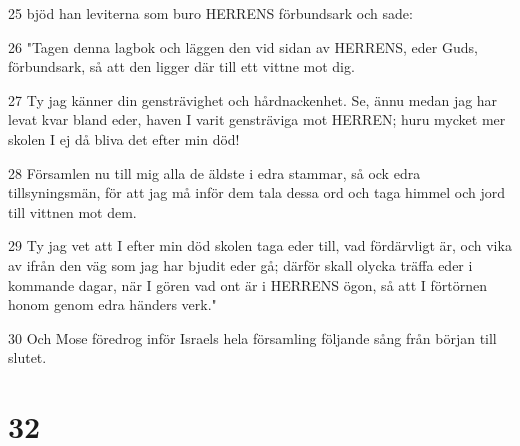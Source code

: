 \par 25 bjöd han leviterna som buro HERRENS förbundsark och sade:
\par 26 "Tagen denna lagbok och läggen den vid sidan av HERRENS, eder Guds, förbundsark, så att den ligger där till ett vittne mot dig.
\par 27 Ty jag känner din gensträvighet och hårdnackenhet. Se, ännu medan jag har levat kvar bland eder, haven I varit gensträviga mot HERREN; huru mycket mer skolen I ej då bliva det efter min död!
\par 28 Församlen nu till mig alla de äldste i edra stammar, så ock edra tillsyningsmän, för att jag må inför dem tala dessa ord och taga himmel och jord till vittnen mot dem.
\par 29 Ty jag vet att I efter min död skolen taga eder till, vad fördärvligt är, och vika av ifrån den väg som jag har bjudit eder gå; därför skall olycka träffa eder i kommande dagar, när I gören vad ont är i HERRENS ögon, så att I förtörnen honom genom edra händers verk."
\par 30 Och Mose föredrog inför Israels hela församling följande sång från början till slutet.

\chapter{32}


